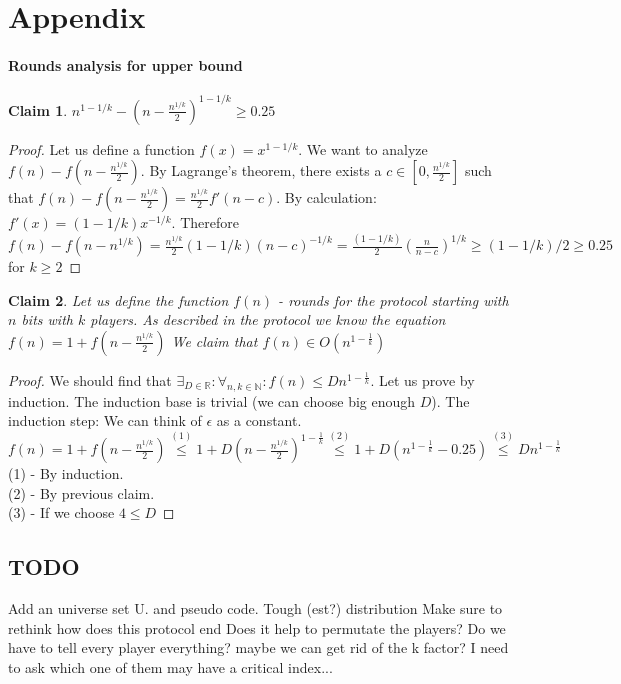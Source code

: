 \documentclass{article}
\theoremstyle{plain}
\newtheorem{claim}{Claim}
\begin{document}
\section{Appendix}
\paragraph{Rounds analysis for upper bound}
\begin{claim}
    $n^{1 - 1/k} - (n-\frac{n^{1/k}}{2})^{1-1/k} \geq 0.25$
\end{claim}
\begin{proof}
    Let us define a function $f(x) = x^{1-1/k}$. We want to analyze $f(n) - f(n-\frac{n^{1/k}}{2})$. By Lagrange's theorem, there exists a $c \in [0, \frac{n^{1/k}}{2}]$ such that $f(n) - f(n-\frac{n^{1/k}}{2}) = \frac{n^{1/k}}{2} f'(n-c)$. By calculation: $f'(x) = (1-1/k)x^{-1/k}$. Therefore $f(n) -  f(n-n^{1/k}) = \frac{n^{1/k}}{2} (1-1/k) (n-c)^{-1/k} = \frac{(1-1/k)}{2} (\frac{n}{n-c})^{1/k} \geq (1-1/k)/2 \geq 0.25$ for $k \geq 2$ 
\end{proof}
\begin{claim}
    Let us define the function $f(n)$ - rounds for the protocol starting with $n$ bits with $k$ players. As described in the protocol we know the equation 
    $f(n) = 1 + f(n - \frac{n^{1/k}}{2})$ \newline
    We claim that $f(n) \in O(n^{1-\frac{1}{k}})$
\end{claim}
\begin{proof}
We should find that $ \exists_{D\in\mathbb{R}} : \forall_{n, k \in \mathbb{N}} : f(n) \leq Dn^{1-\frac{1}{k}}$. Let us prove by induction. The induction base is trivial (we can choose big enough $D$). The induction step: \newline
We can think of $\epsilon$ as a constant. \newline
$f(n) = 1 + f(n - \frac{n^{1/k}}{2}) \overset{(1)}{\leq} 1 + D(n - \frac{n^{1/k}}{2})^{1-\frac{1}{k}} \overset{(2)}{\leq} 1 + D(n^{1-\frac{1}{k}}-0.25) \overset{(3)}{\leq} Dn^{1-\frac{1}{k}}$ \newline
(1) - By induction. \\
(2) - By previous claim. \\
(3) - If we choose $4 \leq D$
\end{proof}

\subsection{TODO}
Add an universe set U. and pseudo code. 
Tough (est?) distribution\newline
Make sure to rethink how does this protocol end \newline
Does it help to permutate the players? \newline
Do we have to tell every player everything? maybe we can get rid of the k factor? I need to ask which one of them may have a critical index... \newline
\end{document}

